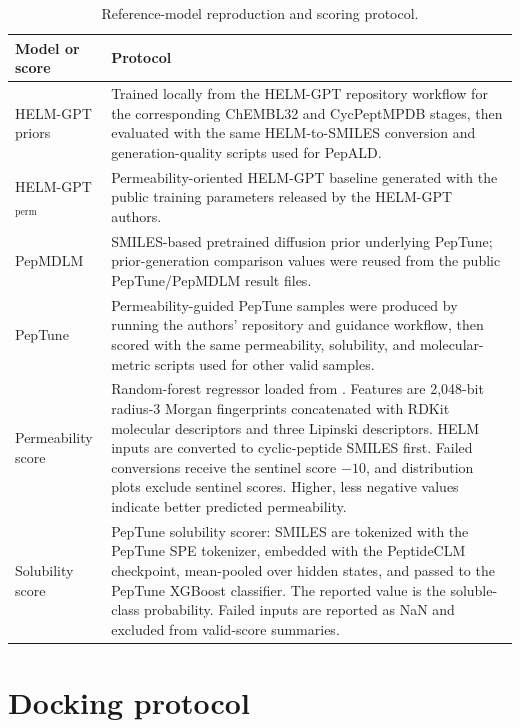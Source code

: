 \documentclass[12pt]{article}
\begin{document}
\begin{table}[htbp]
\centering
\small
\caption{Reference-model reproduction and scoring protocol.}
\label{tab:sup_reference_models}
\begin{tabular}{L{0.23\textwidth}L{0.68\textwidth}}
\toprule
Model or score & Protocol \\
\midrule
HELM-GPT priors & Trained locally from the HELM-GPT repository workflow for the corresponding ChEMBL32 and CycPeptMPDB stages, then evaluated with the same HELM-to-SMILES conversion and generation-quality scripts used for PepALD. \\
HELM-GPT\(_{\mathrm{perm}}\) & Permeability-oriented HELM-GPT baseline generated with the public training parameters released by the HELM-GPT authors. \\
PepMDLM & SMILES-based pretrained diffusion prior underlying PepTune; prior-generation comparison values were reused from the public PepTune/PepMDLM result files. \\
PepTune & Permeability-guided PepTune samples were produced by running the authors' repository and guidance workflow, then scored with the same permeability, solubility, and molecular-metric scripts used for other valid samples. \\
Permeability score & Random-forest regressor loaded from . Features are 2,048-bit radius-3 Morgan fingerprints concatenated with RDKit molecular descriptors and three Lipinski descriptors. HELM inputs are converted to cyclic-peptide SMILES first. Failed conversions receive the sentinel score \(-10\), and distribution plots exclude sentinel scores. Higher, less negative values indicate better predicted permeability. \\
Solubility score & PepTune solubility scorer: SMILES are tokenized with the PepTune SPE tokenizer, embedded with the PeptideCLM checkpoint, mean-pooled over hidden states, and passed to the PepTune XGBoost classifier. The reported value is the soluble-class probability. Failed inputs are reported as NaN and excluded from valid-score summaries. \\
\bottomrule
\end{tabular}
\end{table}
\FloatBarrier

\section{Docking protocol}
\label{supsec:docking_protocol}
\end{document}
